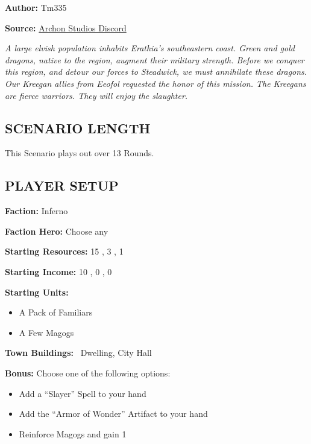 \cleardoublepage{}

\begin{multicols*}{2}

\textbf{Author:} Tm335

\textbf{Source:} \href{https://discord.com/channels/740870068178649108/1243057664666238996/1243057664666238996}{Archon Studios Discord}

\textit{A large elvish population inhabits Erathia's southeastern coast.
Green and gold dragons, native to the region, augment their military strength.
Before we conquer this region, and detour our forces to Steadwick, we must annihilate these dragons.
Our Kreegan allies from Eeofol requested the honor of this mission.
The Kreegans are fierce warriors.
They will enjoy the slaughter.
}

\subsection*{\MakeUppercase{Scenario Length}}

This Scenario plays out over 13 Rounds.

\subsection*{\MakeUppercase{Player Setup}}

\textbf{Faction:} Inferno

\textbf{Faction Hero:} Choose any

\textbf{Starting Resources:} 15 , 3 , 1 

\textbf{Starting Income:} 10 , 0 , 0 

\textbf{Starting Units:}

\begin{itemize}
  \item A Pack of Familiars
  \item A Few Magogs
\end{itemize}

\textbf{Town Buildings:} \bronze\ Dwelling, City Hall

\textbf{Bonus:} Choose one of the following options:
\begin{itemize}
  \item Add a ``Slayer'' Spell to your hand
  \item Add the ``Armor of Wonder'' Artifact to your hand
  \item Reinforce Magogs and gain 1 
\end{itemize}


\end{multicols*}
